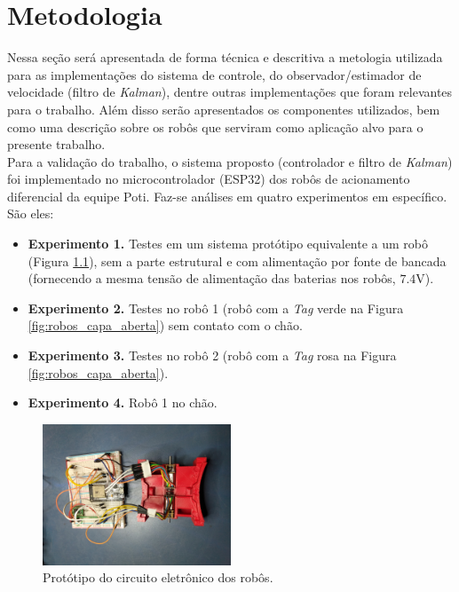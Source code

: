 \chapter[Metodologia]{Metodologia}
\label{ch:metodologia}

Nessa seção será apresentada de forma técnica e descritiva a metologia utilizada para as implementações do sistema de controle, do observador/estimador de velocidade (filtro de \emph{Kalman}), dentre outras implementações que foram relevantes para o trabalho. Além disso serão apresentados os componentes utilizados, bem como uma descrição sobre os robôs que serviram como aplicação alvo para o presente trabalho.\\

Para a validação do trabalho, o sistema proposto (controlador e filtro de \emph{Kalman}) foi implementado no microcontrolador (ESP32) dos robôs de acionamento diferencial da equipe Poti. Faz-se análises em quatro experimentos em específico. São eles:

\begin{itemize}
    \item \textbf{Experimento 1.} Testes em um sistema protótipo equivalente a um robô (Figura \ref{fig:prototipo}), sem a parte estrutural e com alimentação por fonte de bancada (fornecendo a mesma tensão de alimentação das baterias nos robôs, $7.4$V).
    \item \textbf{Experimento 2.} Testes no robô 1 (robô com a \emph{Tag} verde na Figura \ref{fig:robos_capa_aberta}) sem contato com o chão.
    \item \textbf{Experimento 3.} Testes no robô 2 (robô com a \emph{Tag} rosa na Figura \ref{fig:robos_capa_aberta}).
    \item \textbf{Experimento 4.} Robô 1 no chão.
\end{itemize}

\begin{figure}[H]
    \centering
    \includegraphics[width=0.5\textwidth]{figuras/robo/protoboard.jpg}
    \caption{Protótipo do circuito eletrônico dos robôs.}
    \label{fig:prototipo}
\end{figure}

